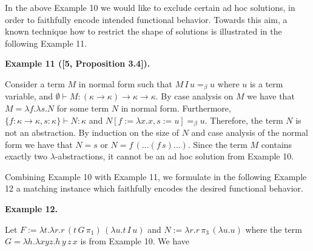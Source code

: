 \documentclass[10pt,a4paper]{amsart}
\begin{document}
 
 
 
In the above Example 10 we would like to exclude certain ad hoc solutions, in order to faithfully encode intended functional behavior. Towards this aim, a known technique how to restrict the shape of solutions is illustrated in the following Example 11.\par
 
 
 
\par\medskip\noindent\textbf{Example 11 ([5, Proposition 3.4]).}\par
 
 
Consider a term $M$ in normal form such that $M\,I\,u=_{\beta}u$ where $u$ is a term variable, and $\emptyset\vdash M:(\kappa\to\kappa)\to\kappa\to\kappa$. By case analysis on $M$ we have that $M=\lambda f.\lambda s.N$ for some term $N$ in normal form. Furthermore, $\{f:\kappa\to\kappa,s:\kappa\}\vdash N:\kappa$ and $N[f:=\lambda x.x,s:=u]=_{\beta}u$. Therefore, the term $N$ is not an abstraction. By induction on the size of $N$ and case analysis of the normal form we have that $N=s$ or $N=f\,(\ldots(f\,s)\ldots)$. Since the term $M$ contains exactly two $\lambda$-abstractions, it cannot be an ad hoc solution from Example 10.\par
 
 
 
 
Combining Example 10 with Example 11, we formulate in the following Example 12 a matching instance which faithfully encodes the desired functional behavior.\par
 
 
 
\par\medskip\noindent\textbf{Example 12.}\par
 
 
Let $F:=\lambda t.\lambda r.r\,(t\,G\,\pi_{1})\,(\lambda u.t\,I\,u)$ and $N:=\lambda r.r\,\pi_{3}\,(\lambda u.u)$ where the term $G=\lambda h.\lambda xyz.h\,y\,z\,x$ is from Example 10. We have\par
  
\end{document}
